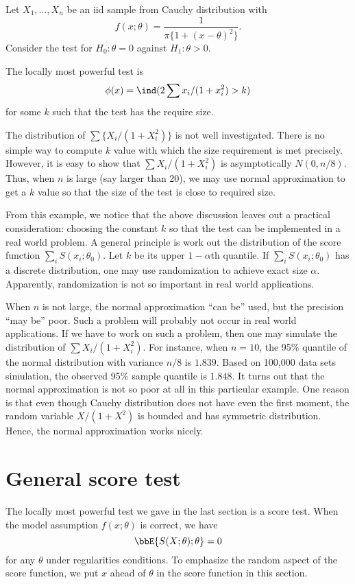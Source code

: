 \begin{example}
Let $X_1, \ldots, X_n$ be an iid sample from Cauchy distribution with
\[
f(x; \theta) = \frac{1}{\pi \{ 1 + (x - \theta)^2 \}}.
\]
Consider the test for $H_0: \theta = 0$ 
against $H_1: \theta > 0$.

The locally most powerful test is
\[
\phi(x) = \ind ( 2 \sum x_i/(1+ x_i^2) > k)
\]
for some $k$ such that the test has the require size.
\end{example}

The distribution of $\sum \{X_i/(1+ X_i^2)\}$ is not well investigated.
There is no simple way to compute $k$ value with which
the size requirement is met precisely.
However, it is easy to show that
$\sum X_i/(1+ X_i^2)$ is asymptotically $N(0, n/8)$.
Thus, when $n$ is large (say larger than 20), we may use normal
approximation to get a $k$ value so that the size of the test
is close to required size.

From this example, we notice that the above discussion leaves
out a practical consideration: choosing the constant $k$ so that
the test can be implemented in a real world problem. 
A general principle is work out the distribution of the score
function $\sum_i S(x_i; \theta_0)$. Let $k$ be its upper
$1-\alpha$th quantile. If $\sum_i S(x_i; \theta_0)$ has a discrete
distribution, one may use randomization to achieve exact size
$\alpha$. Apparently, randomization is not so important in real
world applications.

When $n$ is not large, the normal approximation ``can be'' used,
but the precision ``may be'' poor. Such a problem will probably
not occur in real world applications. If we have to work on such
a problem, then one may simulate the distribution of $\sum X_i/(1+ X_i^2)$.
For instance, when $n=10$, the 95\% quantile of the normal distribution
with variance $n/8$ is $1.839$. Based on 100,000 data sets simulation, the
observed 95\% sample quantile is $1.848$.
It turns out that the normal approximation is not so poor at all
in this particular example. One reason is that even though
Cauchy distribution does not have even the first moment, the
random variable $X/(1+X^2)$ is bounded and has symmetric
distribution. Hence, the normal approximation works nicely.

\section{General score test}
The locally most powerful test we gave in the last section is a score test.
When the model assumption $f(x; \theta)$ is correct, we have
\[
\bbE \{ S(X; \theta); \theta \} = 0
\]
for any $\theta$ under regularities conditions.
To emphasize the random aspect of the score function, we
put $x$ ahead of $\theta$ in the score function in this section.

